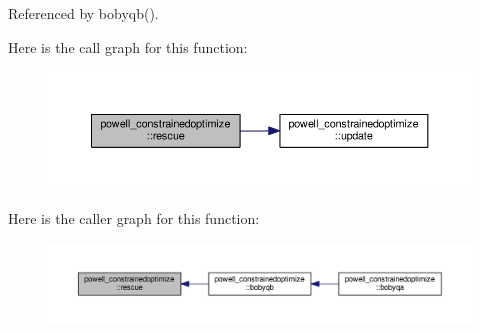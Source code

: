 Referenced by bobyqb().

Here is the call graph for this function\+:
\nopagebreak
\begin{figure}[H]
\begin{center}
\leavevmode
\includegraphics[width=350pt]{namespacepowell__constrainedoptimize_a2a5e8cfa32743f237ece75e1b4d00469_cgraph}
\end{center}
\end{figure}
Here is the caller graph for this function\+:
\nopagebreak
\begin{figure}[H]
\begin{center}
\leavevmode
\includegraphics[width=350pt]{namespacepowell__constrainedoptimize_a2a5e8cfa32743f237ece75e1b4d00469_icgraph}
\end{center}
\end{figure}
\mbox{\label{namespacepowell__constrainedoptimize_a8d96126f07f9d909b52d61690eaa4c80}} 
